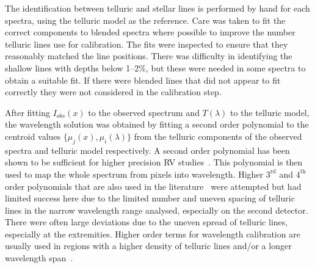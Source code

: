 The identification between telluric and stellar lines is performed by hand for each spectra, using the telluric model as the reference.
Care was taken to fit the correct components to blended spectra where possible to improve the number telluric lines use for calibration.
The fits were inspected to ensure that they reasonably matched the line positions.
There was difficulty in identifying the shallow lines with depths below 1--2\%, but these were needed in some spectra to obtain a suitable fit.
If there were blended lines that did not appear to fit correctly they were not considered in the calibration step.

After fitting \(I_{obs}(x)\) to the observed spectrum and \(T(\lambda)\) to the telluric model, the wavelength solution was obtained by fitting a second order polynomial to the centroid values \(\{\mu_{j}(x), \mu_{i}(\lambda)\}\) from the telluric components of the observed spectra and telluric model respectively.
A second order polynomial has been shown to be sufficient for higher precision {RV} studies~\citep[e.g.][]{bean_groundbased_2010, figueira_radial_2010}.
This polynomial is then used to map the whole spectrum from pixels into wavelength.
Higher \(3^{\textrm{rd}}\) and \(4^{\textrm{th}}\) order polynomials that are also used in the literature~\citep[e.g.][]{seifahrt_synthesising_2010, ulmer-moll_telluric_2018} were attempted but had limited success here due to the limited number and uneven spacing of telluric lines in the narrow wavelength range analysed, especially on the second detector.
There were often large deviations due to the uneven spread of telluric lines, especially at the extremities.
Higher order terms for wavelength calibration are usually used in regions with a higher density of telluric lines and/or a longer wavelength span~\citep{piskorz_evidence_2016, seifahrt_synthesising_2010, ulmer-moll_telluric_2018}.

